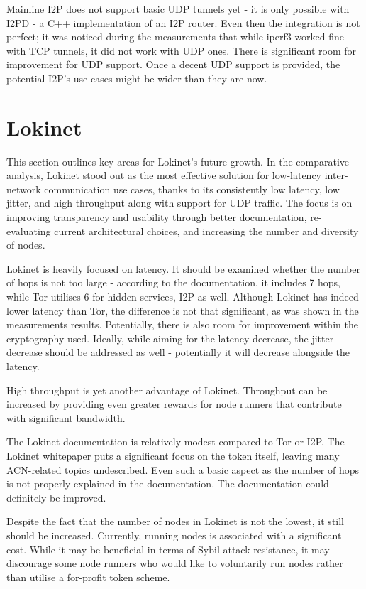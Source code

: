 Mainline I2P does not support basic UDP tunnels yet - it is only possible with I2PD - a C++ implementation of an I2P router. Even then the integration is not perfect; it was noticed during the measurements that while iperf3 worked fine with TCP tunnels, it did not work with UDP ones. There is significant room for improvement for UDP support. Once a decent UDP support is provided, the potential I2P's use cases might be wider than they are now.


\section{Lokinet}

This section outlines key areas for Lokinet’s future growth. In the comparative analysis, Lokinet stood out as the most effective solution for low-latency inter-network communication use cases, thanks to its consistently low latency, low jitter, and high throughput along with support for UDP traffic. The focus is on improving transparency and usability through better documentation, re-evaluating current architectural choices, and increasing the number and diversity of nodes.

Lokinet is heavily focused on latency. It should be examined whether the number of hops is not too large - according to the documentation, it includes 7 hops, while Tor utilises 6 for hidden services, I2P as well. Although Lokinet has indeed lower latency than Tor, the difference is not that significant, as was shown in the measurements results. Potentially, there is also room for improvement within the cryptography used. Ideally, while aiming for the latency decrease, the jitter decrease should be addressed as well - potentially it will decrease alongside the latency. 

High throughput is yet another advantage of Lokinet. Throughput can be increased by providing even greater rewards for node runners that contribute with significant bandwidth.

The Lokinet documentation is relatively modest compared to Tor or I2P. The Lokinet whitepaper puts a significant focus on the token itself, leaving many ACN-related topics undescribed. Even such a basic aspect as the number of hops is not properly explained in the documentation. The documentation could definitely be improved.

Despite the fact that the number of nodes in Lokinet is not the lowest, it still should be increased. Currently, running nodes is associated with a significant cost. While it may be beneficial in terms of Sybil attack resistance, it may discourage some node runners who would like to voluntarily run nodes rather than utilise a for-profit token scheme.


